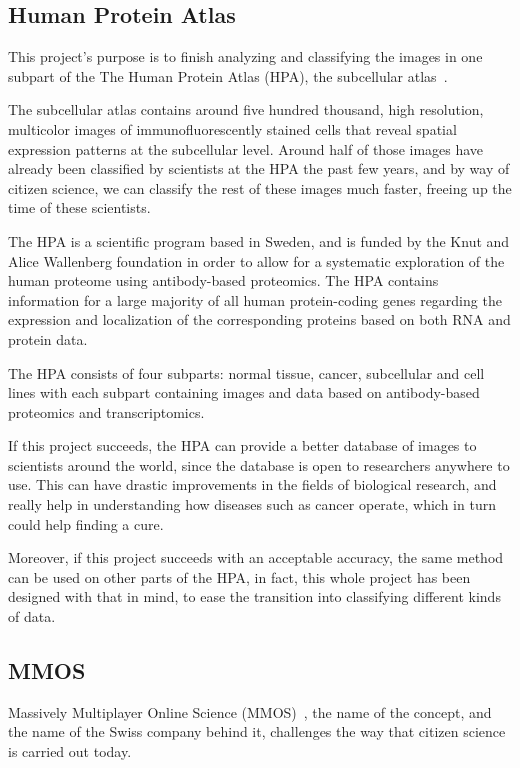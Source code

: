 \subsection{Human Protein Atlas}

This project's purpose is to finish analyzing and classifying the images in one subpart of the The Human Protein Atlas (HPA), the subcellular atlas~\cite{subcellatlas}.

The subcellular atlas contains around five hundred thousand, high resolution, multicolor images of immunofluorescently stained cells that reveal spatial expression patterns at the subcellular level. Around half of those images have already been classified by scientists at the HPA the past few years, and by way of citizen science, we can classify the rest of these images much faster, freeing up the time of these scientists.

The HPA is a scientific program based in Sweden, and is funded by the Knut and Alice Wallenberg foundation in order to allow for a systematic exploration of the human proteome using antibody-based proteomics. The HPA contains information for a large majority of all human protein-coding genes regarding the expression and localization of the corresponding proteins based on both RNA and protein data.

The HPA consists of four subparts: normal tissue, cancer, subcellular and cell lines with each subpart containing images and data based on antibody-based proteomics and transcriptomics.

If this project succeeds, the HPA can provide a better database of images to scientists around the world, since the database is open to researchers anywhere to use. This can have drastic improvements in the fields of biological research, and really help in understanding how diseases such as cancer operate, which in turn could help finding a cure. 

Moreover, if this project succeeds with an acceptable accuracy, the same method can be used on other parts of the HPA, in fact, this whole project has been designed with that in mind, to ease the transition into classifying different kinds of data.

\subsection{MMOS}

Massively Multiplayer Online Science (MMOS)~\cite{mmos}, the name of the concept, and the name of the Swiss company behind it, challenges the way that citizen science is carried out today. 

